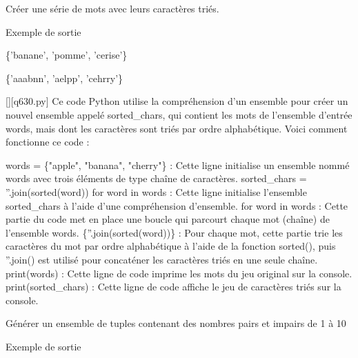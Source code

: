         \question
        Créer une série de mots avec leurs caractères triés.

Exemple de sortie

\{'banane', 'pomme', 'cerise'\}

\{'aaabnn', 'aelpp', 'cehrry'\}
        \par
        \begin{solution}
            \renewcommand{\nomfichier}{q630.py}
            \pythonfile{\chemincode \nomfichier}[][\nomfichier]
            Ce code Python utilise la compréhension d'un ensemble pour créer un nouvel ensemble appelé sorted\_chars, qui contient les mots de l'ensemble d'entrée words, mais dont les caractères sont triés par ordre alphabétique. Voici comment fonctionne ce code :

    words = \{"apple", "banana", "cherry"\} : Cette ligne initialise un ensemble nommé words avec trois éléments de type chaîne de caractères.
    sorted\_chars = {''.join(sorted(word)) for word in words} : Cette ligne initialise l'ensemble sorted\_chars à l'aide d'une compréhension d'ensemble.
        for word in words : Cette partie du code met en place une boucle qui parcourt chaque mot (chaîne) de l'ensemble words.
        \{''.join(sorted(word))\} : Pour chaque mot, cette partie trie les caractères du mot par ordre alphabétique à l'aide de la fonction sorted(), puis ''.join() est utilisé pour concaténer les caractères triés en une seule chaîne.
    print(words) : Cette ligne de code imprime les mots du jeu original sur la console.
    print(sorted\_chars) : Cette ligne de code affiche le jeu de caractères triés sur la console.
        \end{solution}
        

        \question
        Générer un ensemble de tuples contenant des nombres pairs et impairs de 1 à 10

Exemple de sortie

